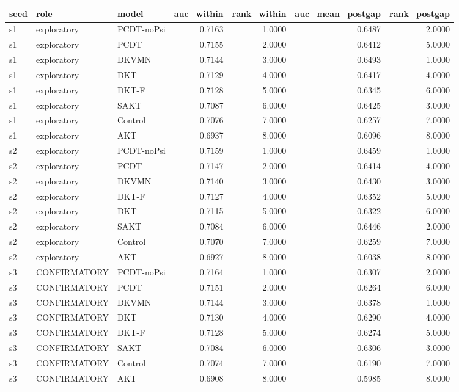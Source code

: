 \begin{tabular}{lllrrrr}
\toprule
seed & role & model & auc\_within & rank\_within & auc\_mean\_postgap & rank\_postgap \\
\midrule
s1 & exploratory & PCDT-noPsi & 0.7163 & 1.0000 & 0.6487 & 2.0000 \\
s1 & exploratory & PCDT & 0.7155 & 2.0000 & 0.6412 & 5.0000 \\
s1 & exploratory & DKVMN & 0.7144 & 3.0000 & 0.6493 & 1.0000 \\
s1 & exploratory & DKT & 0.7129 & 4.0000 & 0.6417 & 4.0000 \\
s1 & exploratory & DKT-F & 0.7128 & 5.0000 & 0.6345 & 6.0000 \\
s1 & exploratory & SAKT & 0.7087 & 6.0000 & 0.6425 & 3.0000 \\
s1 & exploratory & Control & 0.7076 & 7.0000 & 0.6257 & 7.0000 \\
s1 & exploratory & AKT & 0.6937 & 8.0000 & 0.6096 & 8.0000 \\
s2 & exploratory & PCDT-noPsi & 0.7159 & 1.0000 & 0.6459 & 1.0000 \\
s2 & exploratory & PCDT & 0.7147 & 2.0000 & 0.6414 & 4.0000 \\
s2 & exploratory & DKVMN & 0.7140 & 3.0000 & 0.6430 & 3.0000 \\
s2 & exploratory & DKT-F & 0.7127 & 4.0000 & 0.6352 & 5.0000 \\
s2 & exploratory & DKT & 0.7115 & 5.0000 & 0.6322 & 6.0000 \\
s2 & exploratory & SAKT & 0.7084 & 6.0000 & 0.6446 & 2.0000 \\
s2 & exploratory & Control & 0.7070 & 7.0000 & 0.6259 & 7.0000 \\
s2 & exploratory & AKT & 0.6927 & 8.0000 & 0.6038 & 8.0000 \\
s3 & CONFIRMATORY & PCDT-noPsi & 0.7164 & 1.0000 & 0.6307 & 2.0000 \\
s3 & CONFIRMATORY & PCDT & 0.7151 & 2.0000 & 0.6264 & 6.0000 \\
s3 & CONFIRMATORY & DKVMN & 0.7144 & 3.0000 & 0.6378 & 1.0000 \\
s3 & CONFIRMATORY & DKT & 0.7130 & 4.0000 & 0.6290 & 4.0000 \\
s3 & CONFIRMATORY & DKT-F & 0.7128 & 5.0000 & 0.6274 & 5.0000 \\
s3 & CONFIRMATORY & SAKT & 0.7084 & 6.0000 & 0.6306 & 3.0000 \\
s3 & CONFIRMATORY & Control & 0.7074 & 7.0000 & 0.6190 & 7.0000 \\
s3 & CONFIRMATORY & AKT & 0.6908 & 8.0000 & 0.5985 & 8.0000 \\
\bottomrule
\end{tabular}
